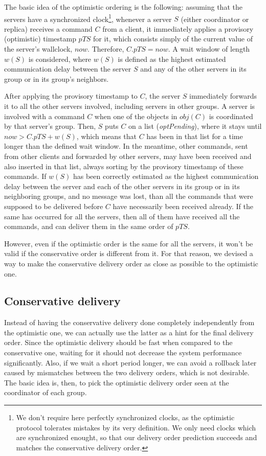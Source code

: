 \documentclass[times, 10pt]{article}
\begin{document}
The basic idea of the optimistic ordering is the following: assuming that the servers have a synchronized clock\footnote{We don't require here perfectly synchronized clocks, as the optimistic protocol tolerates mistakes by its very definition. We only need clocks which are synchronized enought, so that our delivery order prediction succeeds and matches the conservative delivery order.}, whenever a server $S$ (either coordinator or replica) receives a command $C$ from a client, it immediately applies a provisory (optimistic) timestamp $pTS$ for it, which consists simply of the current value of the server's wallclock, $now$. Therefore, $C.pTS=now$. A wait window of length $w(S)$ is considered, where $w(S)$ is defined as the highest estimated communication delay between the server $S$ and any of the other servers in its group or in its group's neighbors.

After applying the provisory timestamp to $C$, the server $S$ immediately forwards it to all the other servers involved, including servers in other groups. A server is involved with a command $C$ when one of the objects in $obj(C)$ is coordinated by that server's group. Then, $S$ puts $C$ on a list (\mbox{\textit{optPending}}), where it stays until $now>C.pTS+w(S)$, which means that $C$ has been in that list for a time longer than the defined wait window. In the meantime, other commands, sent from other clients and forwarded by other servers, may have been received and also inserted in that list, always sorting by the provisory timestamp of these commands. If $w(S)$ has been correctly estimated as the highest communication delay between the server and each of the other servers in its group or in its neighboring groups, and no message was lost, than all the commands that were supposed to be delivered before $C$ have necessarily been received already. If the same has occurred for all the servers, then all of them have received all the commands, and can deliver them in the same order of $pTS$.

However, even if the optimistic order is the same for all the servers, it won't be valid if the conservative order is different from it. For that reason, we devised a way to make the conservative delivery order as close as possible to the optimistic one.

\subsection{Conservative delivery}

Instead of having the conservative delivery done completely independently from the optimistic one, we can actually use the latter as a hint for the final delivery order. Since the optimistic delivery should be fast when compared to the conservative one, waiting for it should not decrease the system performance significantly. Also, if we wait a short period longer, we can avoid a rollback later caused by mismatches between the two delivery orders, which is not desirable. The basic idea is, then, to pick the optimistic delivery order seen at the coordinator of each group.
\end{document}
